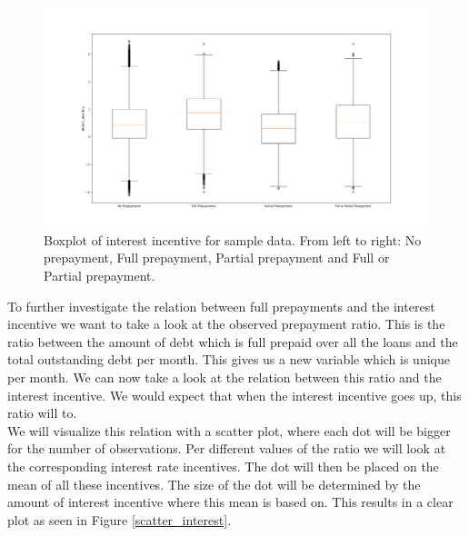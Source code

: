         \begin{figure}[H]
            \centering
            \includegraphics[width=\linewidth]{Latex/Report/Figures/Boxplots_interest_incentive.png}
            \caption{Boxplot of interest incentive for sample data. From left to right: No prepayment, Full prepayment, Partial prepayment and Full or Partial prepayment.}
            \label{boxplots_incentive}
        \end{figure}
        
To further investigate the relation between full prepayments and the interest incentive we want to take a look at the observed prepayment ratio. This is the ratio between the amount of debt which is full prepaid over all the loans and the total outstanding debt per month. This gives us a new variable which is unique per month. We can now take a look at the relation between this ratio and the interest incentive. We would expect that when the interest incentive goes up, this ratio will to. \\
We will visualize this relation with a scatter plot, where each dot will be bigger for the number of observations. Per different values of the ratio we will look at the corresponding interest rate incentives. The dot will then be placed on the mean of all these incentives. The size of the dot will be determined by the amount of interest incentive where this mean is based on. This results in a clear plot as seen in Figure \ref{scatter_interest}.

